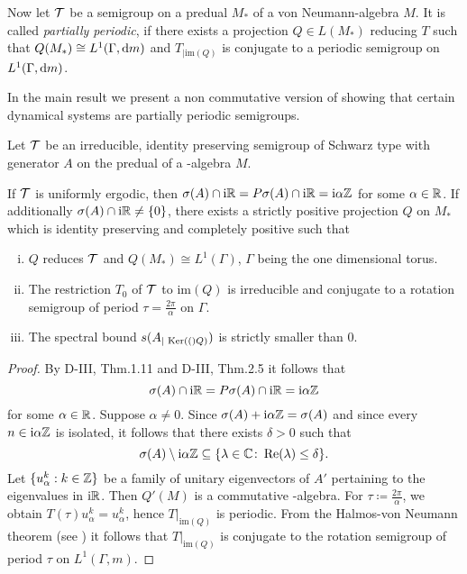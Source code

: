 Now let $ \mathcal{T} $  be a semigroup on a predual $ M_{*} $ of a von Neumann-algebra $ M $.
It is called \emph{partially periodic}, if there exists a projection $ Q \in L(M_{*}) $  reducing $ T $  such that $ Q(M_{*}) \cong L^{1}(\Gamma,\mathop{}\!\mathrm{d}{m}) $  and $ T_{| \text{im}(Q)} $  is conjugate to a periodic semigroup on $ L^{1}(\Gamma,\mathop{}\!\mathrm{d}{m}) $.

In the main result we present a non commutative version of \citet{nagel:1984} showing that certain dynamical systems are partially periodic semigroups.
\begin{proposition}\label{prop:d4-3.10}
Let $ \mathcal{T} $  be an irreducible, identity preserving semigroup of Schwarz type with generator $ A $  on the predual of a \WA-algebra $ M $.

If $ \mathcal{T} $  is uniformly ergodic, then $ \sigma(A) \cap \mathrm{i}\mathbb{R} = P\sigma(A) \cap \mathrm{i}\mathbb{R} = \mathrm{i}\alpha\mathbb{Z} $  for some $ \alpha \in \mathbb{R} $.
If additionally $ \sigma(A) \cap \mathrm{i}\mathbb{R} \neq \{0\} $, there exists a strictly positive projection $ Q $  on $ M_{*} $  which is identity preserving and completely positive such that
\begin{enumerate}[(i)]
\item
$ Q $  reduces $ \mathcal{T} $  and $ Q(M_{*}) \cong L^{1}(\Gamma) $, $ \Gamma $  being the one dimensional torus.

\item
The restriction $ T_{0} $  of $ \mathcal{T} $  to $ \text{im}(Q) $  is irreducible and conjugate to a rotation semigroup of period $ \tau = \frac{2\pi}{\alpha} $  on $ \Gamma $.

\item
The spectral bound $ s(A_{| \mathop{}\mathrm{Ker}(()Q)}) $  is strictly smaller than $ 0 $.
\end{enumerate}
\end{proposition}
\begin{proof}
By D-III, Thm.1.11 and D-III, Thm.2.5 it follows that
\[
\sigma(A) \cap \mathrm{i}\mathbb{R} = P\sigma(A) \cap \mathrm{i}\mathbb{R} = \mathrm{i}\alpha\mathbb{Z}
\]
for some $ \alpha \in \mathbb{R} $.
Suppose $ \alpha \neq 0 $.
Since $ \sigma(A) + \mathrm{i}\alpha\mathbb{Z} = \sigma(A) $  and since every $ n \in \mathrm{i}\alpha\mathbb{Z} $  is isolated, it follows that there exists $ \delta > 0 $  such that
\[
\sigma(A) \setminus \mathrm{i}\alpha\mathbb{Z} \subseteq \{\lambda \in \mathbb{C} \colon  \mathop{}\!\mathrm{Re}(\lambda) \leq \delta\}.
\]
Let $ \{u_{\alpha}^{k}: k \in \mathbb{Z}\} $  be a family of unitary eigenvectors of $ A' $  pertaining to the eigenvalues in $ \mathrm{i}\mathbb{R} $.
Then $ Q'(M) $  is a commutative \WA-algebra.
For $ \tau \coloneqq \frac{2\pi}{\alpha} $, we obtain $ T(\tau)u_{\alpha}^{k} = u_{\alpha}^{k} $, hence $ T|_{\text{im}(Q)} $  is periodic.
From the Halmos-von Neumann theorem (see \citet[Thm. III.7.11]{schaefer:1974})
it follows that $ T|_{\text{im}(Q)} $  is conjugate to the rotation semigroup of period $ \tau $  on $ L^{1}(\Gamma,m) $.
\end{proof}
